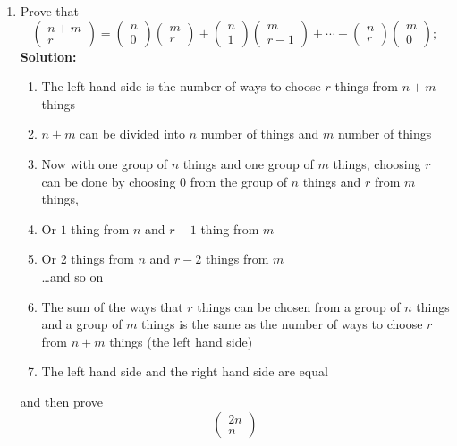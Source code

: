 \documentclass{report}
\begin{document}
\begin{enumerate}
\item Prove that
\[
  \begin{pmatrix}
  n+m \\
  r
  \end{pmatrix}
  =\begin{pmatrix}
  n\\ 0
  \end{pmatrix}\begin{pmatrix}
  m\\ r
  \end{pmatrix}+\begin{pmatrix}
  n\\ 1
  \end{pmatrix}\begin{pmatrix}
  m\\ r-1
  \end{pmatrix}+\cdots +
  \begin{pmatrix}
  n\\ r
  \end{pmatrix}\begin{pmatrix}
  m\\ 0
  \end{pmatrix};
\]
{\bf Solution:}
    \begin{enumerate}
        \item The left hand side is the number of ways to choose $r$ things from $n+m$ things 
        \item $n+m$ can be divided into $n$ number of things and $m$ number of things
        \item Now with one group of $n$ things and one group of $m$ things, choosing $r$ can be done by choosing 0 from the group of $n$ things and $r$ from $m$ things,
        \item Or $1$ thing from $n$ and $r-1$ thing from $m$
        \item Or 2 things from $n$ and $r-2$ things from $m$
        \\ \dots and so on
        \item The sum of the ways that $r$ things can be chosen from a group of $n$ things and a group of $m$ things is the same as the number of ways to choose $r$ from $n+m$ things (the left hand side)
        \item The left hand side and the right hand side are equal
    \end{enumerate}
and then prove 
\[
 \begin{pmatrix}
2n \\
n
\end{pmatrix}
\]
\end{enumerate}
\end{document}
